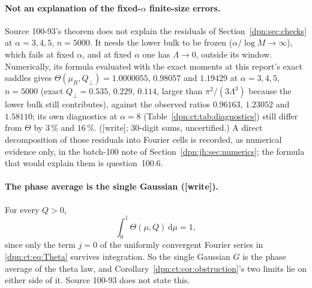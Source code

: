 \documentclass[11pt]{article}
\numberwithin{equation}{section}
\theoremstyle{definition}\newtheorem{definition}[theorem]{Definition}
\theoremstyle{remark}\newtheorem{remark}[theorem]{Remark}
\newcommand{\dd}{\,\mathrm d}\newcommand{\ii}{\mathrm i}
\newcommand{\wrt}{\textup{[write]}}
\begin{document}
\paragraph{Not an explanation of the fixed-$\alpha$ finite-size errors.}
Source 100-93's theorem does not explain the residuals of
Section~\ref{dpn:sec:checks} at $\alpha=3,4,5$, $n=5000$.  It needs the lower
bulk to be frozen ($\alpha/\log M\to\infty$), which fails at fixed $\alpha$, and
at fixed $\alpha$ one has $\Lambda\to0$, outside its window.  Numerically, its
formula evaluated with the exact moments at this report's exact saddles gives
$\Theta(\mu_R,Q_\perp)=1.0000055$, $0.98057$ and $1.19429$ at $\alpha=3,4,5$,
$n=5000$ (exact $Q_\perp=0.535$, $0.229$, $0.114$, larger than
$\pi^2/(3\Lambda^3)$ because the lower bulk still contributes), against the
observed ratios $0.96163$, $1.23052$ and $1.58110$; its own diagnostics at
$\alpha=8$ (Table~\ref{dpn:ct:tab:diagnostics}) still differ from $\Theta$ by
$3\,\%$ and $16\,\%$.  (\wrt; 30-digit sums, uncertified.)  A direct
decomposition of those residuals into Fourier cells is recorded, as numerical
evidence only, in the batch-100 note of Section~\ref{dpn:jh:sec:numerics};
the formula that would explain them is question~100.6.

\paragraph{The phase average is the single Gaussian (\wrt).}
For every $Q>0$,
\begin{equation}\label{dpn:ct:eq:average}
 \int_0^1\Theta(\mu,Q)\dd\mu=1,
\end{equation}
since only the term $j=0$ of the uniformly convergent Fourier series in
\eqref{dpn:ct:eq:Theta} survives integration.  So the single Gaussian $G$ is
the phase average of the theta law, and
Corollary~\ref{dpn:ct:cor:obstruction}'s two limits lie on either side of it.
Source 100-93 does not state this.

\end{document}
